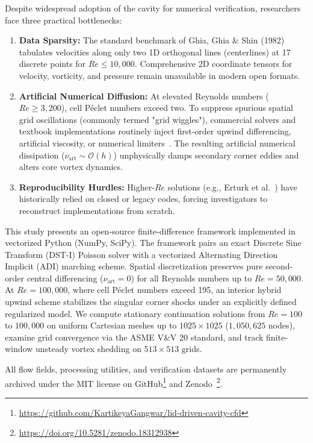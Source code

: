 \documentclass[11pt,a4paper]{article}
\begin{document}
Despite widespread adoption of the cavity for numerical verification, researchers face three practical bottlenecks:
\begin{enumerate}
    \item \textbf{Data Sparsity:} The standard benchmark of Ghia, Ghia \& Shin (1982)~\cite{ghia1982high} tabulates velocities along only two 1D orthogonal lines (centerlines) at 17 discrete points for $Re \le 10{,}000$. Comprehensive 2D coordinate tensors for velocity, vorticity, and pressure remain unavailable in modern open formats.
    \item \textbf{Artificial Numerical Diffusion:} At elevated Reynolds numbers ($Re \ge 3{,}200$), cell P\'eclet numbers exceed two. To suppress spurious spatial grid oscillations (commonly termed "grid wiggles"), commercial solvers and textbook implementations routinely inject first-order upwind differencing, artificial viscosity, or numerical limiters~\cite{patankar1980numerical,spalding1972novel,roache1998verification,ferziger2002computational,lewis2004fundamentals,lewis2016fundamentals}. The resulting artificial numerical dissipation ($\nu_{\text{art}} \sim \mathcal{O}(h)$) unphysically damps secondary corner eddies and alters core vortex dynamics.
    \item \textbf{Reproducibility Hurdles:} Higher-$Re$ solutions (e.g., Erturk et al.~\cite{erturk2005numerical,erturk2009discussions}) have historically relied on closed or legacy codes, forcing investigators to reconstruct implementations from scratch.
\end{enumerate}

This study presents an open-source finite-difference framework implemented in vectorized Python (NumPy, SciPy). The framework pairs an exact Discrete Sine Transform (DST-I) Poisson solver with a vectorized Alternating Direction Implicit (ADI) marching scheme. Spatial discretization preserves pure second-order central differencing ($\nu_{\text{art}} = 0$) for all Reynolds numbers up to $Re = 50{,}000$. At $Re = 100{,}000$, where cell P\'eclet numbers exceed 195, an interior hybrid upwind scheme stabilizes the singular corner shocks under an explicitly defined regularized model. We compute stationary continuation solutions from $Re = 100$ to $100{,}000$ on uniform Cartesian meshes up to $1025 \times 1025$ ($1{,}050{,}625$ nodes), examine grid convergence via the ASME V\&V 20 standard, and track finite-window unsteady vortex shedding on $513 \times 513$ grids.

All flow fields, processing utilities, and verification datasets are permanently archived under the MIT license on GitHub\footnote{\url{https://github.com/KartikeyaGangwar/lid-driven-cavity-cfd}} and Zenodo~\cite{gangwar2026solver}\footnote{\url{https://doi.org/10.5281/zenodo.18312938}}.
\end{document}
